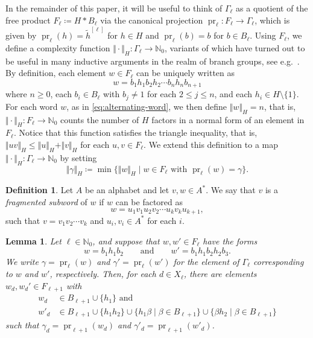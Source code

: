 \documentclass[a4paper]{amsart}
\renewcommand\leq\leqslant
\renewcommand\geq\geqslant
\numberwithin{equation}{section}
\newtheorem{lemma}[theorem]{Lemma}
\theoremstyle{definition}
\newtheorem{definition}[theorem]{Definition}
\theoremstyle{remark}
\newcommand{\N}{\mathbb{N}}
\DeclareMathOperator{\pr}{pr}
\newcommand{\absH}[1]{\Vert #1 \Vert_H}
\newcommand{\defeq}\coloneqq%
\begin{document}
In the remainder of this paper, it will be useful to think of $\Gamma_{\ell}$ as a quotient of the free product $F_{\ell} \defeq H \ast B_{\ell}$ via the canonical projection $\pr_{\ell} \colon F_{\ell} \rightarrow \Gamma_{\ell}$, which is given by $\pr_{\ell}(h) = \widetilde{h}^{[\ell]}$ for $h \in H$ and $\pr_{\ell}(b) = b$ for $b \in B_{\ell}$.
Using $F_{\ell}$, we define a complexity function $\absH{\cdot} \colon \Gamma_\ell\to \N_0$, variants of which have turned out to be useful in many inductive arguments in the realm of branch groups, see e.g.~\cite{AlexoudasKlopschThillaisundaram16,KionkeSchesler22}.
By definition, each element $w\in F_\ell$ can be uniquely written as
\begin{equation}\label{eq:alternating-word}
  w = b_1 h_1 b_2 h_2 \cdots b_n h_n b_{n+1}
\end{equation}
where $n \geq 0$, each $b_i\in B_\ell$ with $b_j\neq 1$ for each $2\leq j\leq n$, and each $h_i\in H\setminus \{1\}$.
For each word $w$, as in \eqref{eq:alternating-word}, we then define $\absH{w}=n$, that is, $\absH{\cdot}\colon F_\ell \to \N_0$ counts the number of $H$ factors in a normal form of an element in $F_\ell$.
Notice that this function satisfies the triangle inequality, that is, $\absH{uv}\leq \absH{u}+\absH{v}$ for each $u,v\in F_\ell$.
We extend this definition to a map $\absH{\cdot}\colon \Gamma_\ell \to \N_0$ by setting
\[
  \absH{\gamma}
  \coloneqq
  \min\{
    \absH{w}
  \mid
    w \in F_\ell\text{ with }
    \pr_\ell(w) = \gamma
  \}.
\]

\begin{definition}\label{def:fragmented-subword}
Let $A$ be an alphabet and let $v,w\in A^*$.
We say that $v$ is a \emph{fragmented subword} of $w$ if $w$ can be factored as
\[
  w = u_1 v_1 u_2 v_2 \cdots u_k v_k u_{k+1},
\]
such that $v = v_1 v_2\cdots v_k$ and $u_i,v_i \in A^*$ for each $i$.
\end{definition}

\begin{lemma}\label{lem:length-contraction-base-case}
  Let $\ell \in \N_0$, and suppose that $w, w' \in F_\ell$ have the forms
  \[
    w = b_1 h_1 b_2
    \qquad\text{and}\qquad
    w' = b_1 h_1 b_2 h_2 b_3.
  \]
  We write $\gamma = \pr_\ell(w)$ and $\gamma'=\pr_\ell(w')$ for the element of $\Gamma_\ell$ corresponding to $w$ and $w'$, respectively.
  Then, for each $d\in X_\ell$, there are elements $w_d,w_d' \in F_{\ell+1}$ with
  \begin{align*}
    w_d &\in
        B_{\ell+1}
        \cup \{ h_1 \}\text{ and}\\
    w'_d &\in
        B_{\ell+1}
        \cup \{ h_1 h_2 \}
        \cup \{ h_1 \beta \mid \beta \in B_{\ell+1} \}
        \cup \{ \beta h_2 \mid \beta \in B_{\ell+1} \}
  \end{align*}
  such that $\gamma_d = \pr_{\ell + 1}(w_d)$ and $\gamma'_d = \pr_{\ell+1}(w'_d)$.
\end{lemma}
\end{document}
